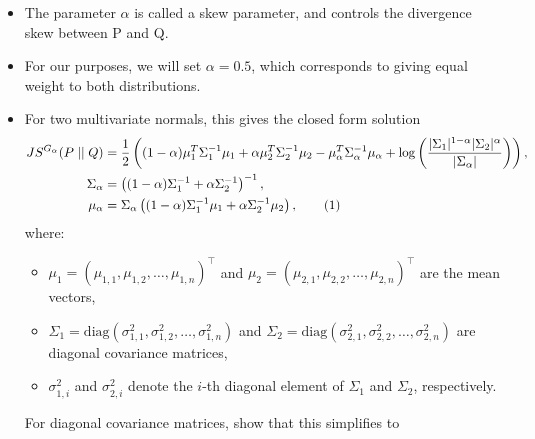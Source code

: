 \documentclass{article}
\DeclarePairedDelimiter\abs{\lvert}{\rvert}%
\newcommand\numberthis{\addtocounter{equation}{1}\tag{\theequation}}
\numberwithin{equation}{section}
\begin{document}
\begin{itemize}
\begin{equation}
    \end{equation}
  \item The parameter $\alpha$ is called a skew parameter, and controls the divergence skew between P and Q. 
  \item For our purposes, we will set $\alpha = 0.5$, which corresponds to giving equal weight to both distributions.
  \item For two multivariate normals, this gives the closed form solution
    \begin{align*}
      JS^{G_{\alpha}}(P \mid\mid Q) &= \frac{1}{2} \left( (1 - \alpha) \mu_1^T \Sigma_1^{-1} \mu_1 + \alpha \mu_2^T \Sigma_2^{-1} \mu_2 - \mu_{\alpha}^T \Sigma_{\alpha}^{-1} \mu_{\alpha} + \log{\left( \frac{\abs{\Sigma_1}^{1-\alpha} \abs{\Sigma_2}^{\alpha}}{\abs{\Sigma_{\alpha}}} \right)} \right), \\
      \Sigma_{\alpha} &= \left( (1 - \alpha) \Sigma_1^{-1} + \alpha \Sigma_2^{-1} \right)^{-1}, \\
      \mu_{\alpha} &= \Sigma_{\alpha} \left( (1 - \alpha) \Sigma_1^{-1} \mu_1 + \alpha \Sigma_2^{-1} \mu_2 \right), \numberthis \label{eq:js_norm_mvn}
    \end{align*} 
    where:
    \begin{itemize}
      \item $\mu_1 = (\mu_{1,1}, \mu_{1,2}, \ldots, \mu_{1,n})^\top$ and $\mu_2 = (\mu_{2,1}, \mu_{2,2}, \ldots, \mu_{2,n})^\top$ are the mean vectors,
      \item $\Sigma_1 = \text{diag}(\sigma_{1,1}^2, \sigma_{1,2}^2, \ldots, \sigma_{1,n}^2)$ and $\Sigma_2 = \text{diag}(\sigma_{2,1}^2, \sigma_{2,2}^2, \ldots, \sigma_{2,n}^2)$ are diagonal covariance matrices,
      \item $\sigma_{1,i}^2$ and $\sigma_{2,i}^2$ denote the $i$-th diagonal element of $\Sigma_1$ and $\Sigma_2$, respectively.
    \end{itemize}
    For diagonal covariance matrices, \citet{Thiagarajan2025} show that this simplifies to

\end{itemize}
\end{document}
